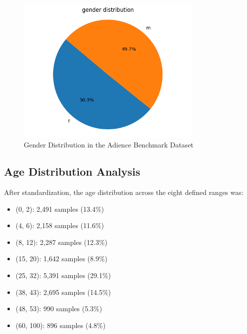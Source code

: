 \documentclass{article}
\begin{document}
\begin{figure}[H]
    \centering
    \includegraphics[width=0.8\textwidth]{assets/gender distribution.png}
    \caption{Gender Distribution in the Adience Benchmark Dataset}
\end{figure}



\subsection{Age Distribution Analysis}

After standardization, the age distribution across the eight defined ranges was:

\begin{itemize}
    \item (0, 2): 2,491 samples (13.4\%)
    \item (4, 6): 2,158 samples (11.6\%)
    \item (8, 12): 2,287 samples (12.3\%)
    \item (15, 20): 1,642 samples (8.9\%)
    \item (25, 32): 5,391 samples (29.1\%) 
    \item (38, 43): 2,695 samples (14.5\%)
    \item (48, 53): 990 samples (5.3\%)
    \item (60, 100): 896 samples (4.8\%) 
\end{itemize}
\end{document}
